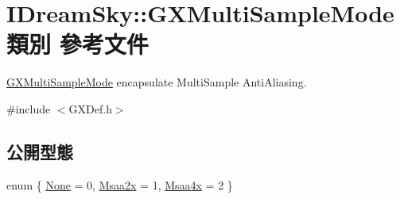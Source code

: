 \hypertarget{class_i_dream_sky_1_1_g_x_multi_sample_mode}{}\section{I\+Dream\+Sky\+:\+:G\+X\+Multi\+Sample\+Mode 類別 參考文件}
\label{class_i_dream_sky_1_1_g_x_multi_sample_mode}


\hyperlink{class_i_dream_sky_1_1_g_x_multi_sample_mode}{G\+X\+Multi\+Sample\+Mode} encapsulate Multi\+Sample Anti\+Aliasing.  




{\ttfamily \#include $<$G\+X\+Def.\+h$>$}

\subsection*{公開型態}
\begin{DoxyCompactItemize}
\item 
enum \{ \hyperlink{class_i_dream_sky_1_1_g_x_multi_sample_mode_a12e8d84984467d5cc2e8eca00fcaf171af350d6500945cabe59c13b6b01d34ee2}{None} = 0, 
\hyperlink{class_i_dream_sky_1_1_g_x_multi_sample_mode_a12e8d84984467d5cc2e8eca00fcaf171a94dd4d7afbee003f013d563057a3b072}{Msaa2x} = 1, 
\hyperlink{class_i_dream_sky_1_1_g_x_multi_sample_mode_a12e8d84984467d5cc2e8eca00fcaf171a9b1e7b6620cf2d61b104187473fc4322}{Msaa4x} = 2
 \}
\end{DoxyCompactItemize}
